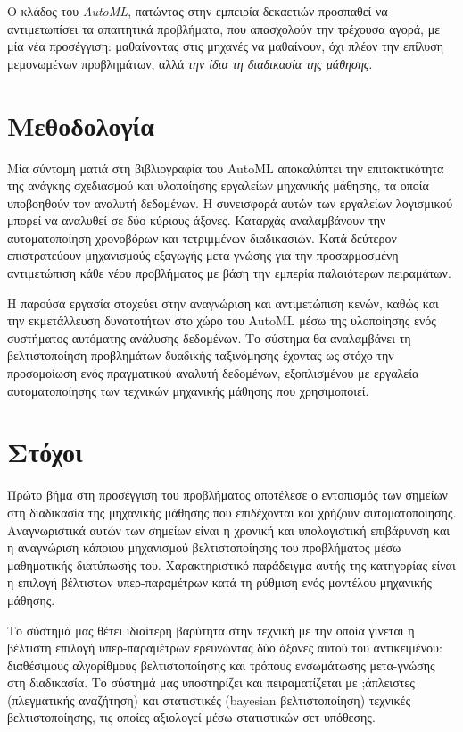 Ο κλάδος του \textit{AutoML}, πατώντας στην εμπειρία δεκαετιών προσπαθεί να αντιμετωπίσει τα απαιτητικά προβλήματα, που απασχολούν την τρέχουσα αγορά, με μία νέα προσέγγιση: μαθαίνοντας στις μηχανές να μαθαίνουν, όχι πλέον την επίλυση μεμονωμένων προβλημάτων, αλλά \textit{την ίδια τη διαδικασία της μάθησης}. 
 

\section{Μεθοδολογία} Μία σύντομη ματιά στη βιβλιογραφία του AutoML αποκαλύπτει την επιτακτικότητα της ανάγκης σχεδιασμού και υλοποίησης εργαλείων μηχανικής μάθησης, τα οποία υποβοηθούν τον αναλυτή δεδομένων. Η συνεισφορά αυτών των εργαλείων λογισμικού μπορεί να αναλυθεί σε δύο κύριους άξονες. Καταρχάς αναλαμβάνουν την αυτοματοποίηση χρονοβόρων και τετριμμένων διαδικασιών. Κατά δεύτερον επιστρατεύουν μηχανισμούς εξαγωγής μετα-γνώσης για την προσαρμοσμένη αντιμετώπιση κάθε νέου προβλήματος με βάση την εμπερία παλαιότερων πειραμάτων. 

Η παρούσα εργασία στοχεύει στην αναγνώριση και αντιμετώπιση κενών, καθώς και την εκμετάλλευση δυνατοτήτων στο χώρο του AutoML μέσω της υλοποίησης ενός συστήματος αυτόματης ανάλυσης δεδομένων. Το σύστημα θα αναλαμβάνει τη βελτιστοποίηση προβλημάτων δυαδικής ταξινόμησης έχοντας ως στόχο την προσομοίωση ενός πραγματικού αναλυτή δεδομένων, εξοπλισμένου με εργαλεία αυτοματοποίησης των τεχνικών μηχανικής μάθησης που χρησιμοποιεί.

\section{Στόχοι}
Πρώτο βήμα στη προσέγγιση του προβλήματος αποτέλεσε ο εντοπισμός των σημείων στη διαδικασία της μηχανικής μάθησης που επιδέχονται και χρήζουν αυτοματοποίησης. Αναγνωριστικά αυτών των σημείων είναι η χρονική και υπολογιστική επιβάρυνση και η αναγνώριση κάποιου μηχανισμού βελτιστοποίησης του προβλήματος μέσω μαθηματικής διατύπωσής του. Χαρακτηριστικό παράδειγμα αυτής της κατηγορίας είναι η επιλογή βέλτιστων υπερ-παραμέτρων κατά τη ρύθμιση ενός μοντέλου μηχανικής μάθησης.

Το σύστημά μας θέτει ιδιαίτερη βαρύτητα στην τεχνική με την οποία γίνεται η βέλτιστη επιλογή υπερ-παραμέτρων ερευνώντας δύο άξονες αυτού του αντικειμένου: διαθέσιμους αλγορίθμους βελτιστοποίησης και τρόπους ενσωμάτωσης μετα-γνώσης στη διαδικασία. Το σύστημά μας υποστηρίζει και πειραματίζεται με ;άπλειστες (πλεγματικής αναζήτηση) και στατιστικές (bayesian βελτιστοποίηση) τεχνικές βελτιστοποίησης, τις οποίες αξιολογεί μέσω στατιστικών σετ υπόθεσης.

